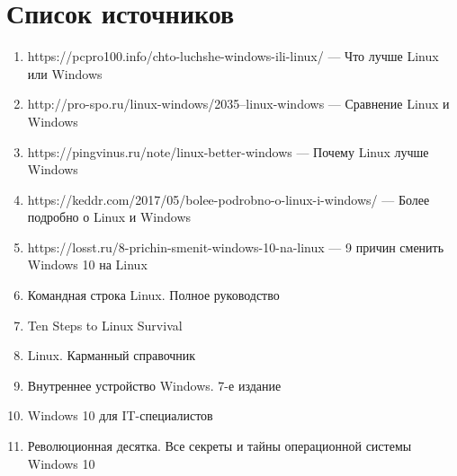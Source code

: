 \documentclass[14pt]{article}
\begin{document}
    \section{Список источников}
    \begin{enumerate}
        \item https://pcpro100.info/chto-luchshe-windows-ili-linux/ --- Что лучше Linux или Windows
        \item http://pro-spo.ru/linux-windows/2035--linux-windows --- Сравнение Linux и Windows
        \item https://pingvinus.ru/note/linux-better-windows --- Почему Linux лучше Windows
        \item https://keddr.com/2017/05/bolee-podrobno-o-linux-i-windows/ --- Более подробно о Linux и Windows
        \item https://losst.ru/8-prichin-smenit-windows-10-na-linux --- 9 причин сменить Windows 10 на Linux
        \item Командная строка Linux. Полное руководство
        \item Ten Steps to Linux Survival
        \item Linux. Карманный справочник
        \item Внутреннее устройство Windows. 7-е издание
        \item Windows 10 для IT-специалистов
        \item Революционная десятка. Все секреты и тайны операционной системы Windows 10
    \end{enumerate}
\end{document}
